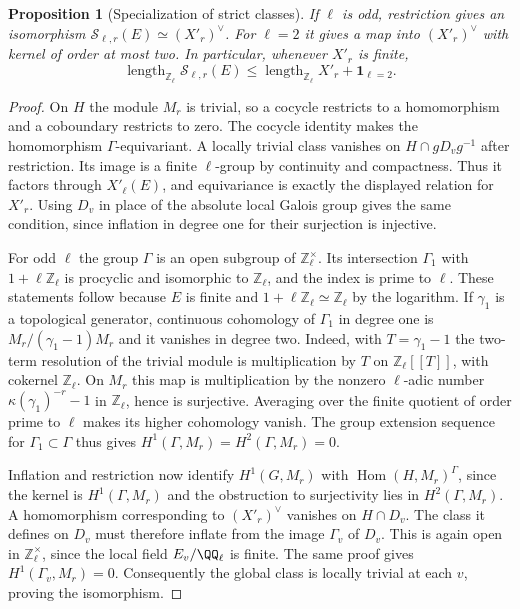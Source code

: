 \documentclass[a4paper,11pt]{article}
\newtheorem{proposition}{Proposition}[section]
\theoremstyle{definition}
\theoremstyle{remark}
\newcommand{\ZZ}{\mathbb Z}\newcommand{\ord}{\operatorname{ord}}
\newcommand{\len}{\operatorname{length}}\newcommand{\Res}{\operatorname*{Res}}
\numberwithin{equation}{section}
\begin{document}
\begin{proposition}[Specialization of strict classes]\label{prop:spec12}
If \(\ell\) is odd, restriction gives an isomorphism \(\mathcal S_{\ell,r}(E)\simeq(X'_r)^\vee\). For \(\ell=2\) it gives a map into \((X'_r)^\vee\) with kernel of order at most two. In particular, whenever \(X'_r\) is finite,
\[
 \len_{\ZZ_\ell}\mathcal S_{\ell,r}(E)
        \le\len_{\ZZ_\ell} X'_r+\mathbf1_{\ell=2}.
\]
\end{proposition}
\begin{proof}
On \(H\) the module \(M_r\) is trivial, so a cocycle restricts to a homomorphism and a coboundary restricts to zero. The cocycle identity makes the homomorphism \(\Gamma\)-equivariant. A locally trivial class vanishes on \(H\cap gD_vg^{-1}\) after restriction. Its image is a finite \(\ell\)-group by continuity and compactness. Thus it factors through \(X'_\ell(E)\), and equivariance is exactly the displayed relation for \(X'_r\). Using \(D_v\) in place of the absolute local Galois group gives the same condition, since inflation in degree one for their surjection is injective.

For odd \(\ell\) the group \(\Gamma\) is an open subgroup of \(\ZZ_\ell^\times\). Its intersection \(\Gamma_1\) with \(1+\ell\ZZ_\ell\) is procyclic and isomorphic to \(\ZZ_\ell\), and the index is prime to \(\ell\). These statements follow because \(E\) is finite and \(1+\ell\ZZ_\ell\simeq\ZZ_\ell\) by the logarithm. If \(\gamma_1\) is a topological generator, continuous cohomology of \(\Gamma_1\) in degree one is \(M_r/(\gamma_1-1)M_r\) and it vanishes in degree two. Indeed, with \(T=\gamma_1-1\) the two-term resolution of the trivial module is multiplication by \(T\) on \(\ZZ_\ell[[T]]\), with cokernel \(\ZZ_\ell\). On \(M_r\) this map is multiplication by the nonzero \(\ell\)-adic number \(\kappa(\gamma_1)^{-r}-1\) in \(\ZZ_\ell\), hence is surjective. Averaging over the finite quotient of order prime to \(\ell\) makes its higher cohomology vanish. The group extension sequence for \(\Gamma_1\subset\Gamma\) thus gives \(H^1(\Gamma,M_r)=H^2(\Gamma,M_r)=0\).

Inflation and restriction now identify \(H^1(G,M_r)\) with \(\operatorname{Hom}(H,M_r)^\Gamma\), since the kernel is \(H^1(\Gamma,M_r)\) and the obstruction to surjectivity lies in \(H^2(\Gamma,M_r)\). A homomorphism corresponding to \((X'_r)^\vee\) vanishes on \(H\cap D_v\). The class it defines on \(D_v\) must therefore inflate from the image \(\Gamma_v\) of \(D_v\). This is again open in \(\ZZ_\ell^\times\), since the local field \(E_v/\QQ_\ell\) is finite. The same proof gives \(H^1(\Gamma_v,M_r)=0\). Consequently the global class is locally trivial at each \(v\), proving the isomorphism.


\end{proof}
\end{document}
